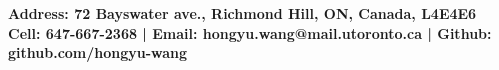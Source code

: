 \documentclass[letterpaper,11pt]{article}
\begin{document}

\vspace{0.1in}

\begin{center}
	\begin{small}
	\bf{Address:} 72 Bayswater ave., Richmond Hill, ON, Canada, L4E4E6\\
	\bf{Cell:} 647-667-2368 |
	\bf{Email:} hongyu.wang@mail.utoronto.ca |
	\bf{Github:} github.com/hongyu-wang
	\end{small}

\end{center}








\vspace{0.1in}









\end{document}
